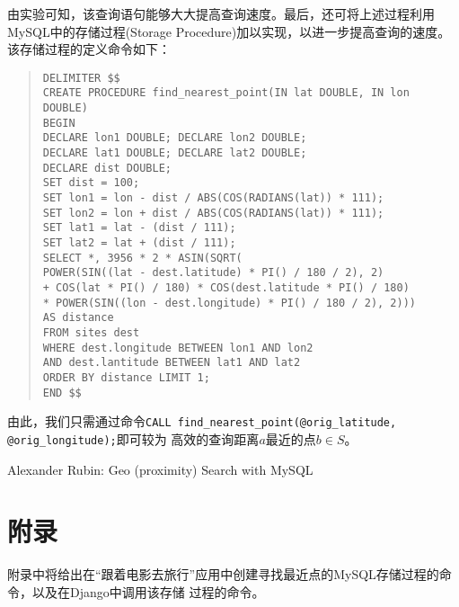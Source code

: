 由实验可知，该查询语句能够大大提高查询速度。最后，还可将上述过程利用MySQL中的存储过程(Storage
Procedure)加以实现，以进一步提高查询的速度。该存储过程的定义命令如下：

\begin{quote}
  \texttt{DELIMITER \$\$\\
    CREATE PROCEDURE find\_nearest\_point(IN lat DOUBLE, IN lon DOUBLE)\\
    BEGIN\\
    DECLARE lon1 DOUBLE; DECLARE lon2 DOUBLE;\\
    DECLARE lat1 DOUBLE; DECLARE lat2 DOUBLE;\\
    DECLARE dist DOUBLE;\\
    SET dist = 100;\\
    SET lon1 = lon - dist / ABS(COS(RADIANS(lat)) * 111);\\
    SET lon2 = lon + dist / ABS(COS(RADIANS(lat)) * 111);\\
    SET lat1 = lat - (dist / 111);\\
    SET lat2 = lat + (dist / 111);\\
    SELECT *, 3956 * 2 * ASIN(SQRT(\\
    POWER(SIN((lat - dest.latitude) * PI() / 180 / 2), 2)\\
    + COS(lat * PI() / 180) * COS(dest.latitude * PI() / 180)\\
    * POWER(SIN((lon - dest.longitude) * PI() / 180 / 2), 2)))\\
    AS distance\\
    FROM sites dest\\
    WHERE dest.longitude BETWEEN lon1 AND lon2\\
    AND dest.lantitude BETWEEN lat1 AND lat2\\
    ORDER BY distance LIMIT 1;\\
    END \$\$} 
\end{quote}

由此，我们只需通过命令\texttt{CALL find\_nearest\_point(@orig\_latitude, @orig\_longitude);}即可较为
高效的查询距离$a$最近的点$b\in S$。

\begin{thebibliography}{99}
 Alexander Rubin: Geo (proximity) Search with MySQL
\end{thebibliography}

\section*{附录}
附录中将给出在“跟着电影去旅行”应用中创建寻找最近点的MySQL存储过程的命令，以及在Django中调用该存储
过程的命令。

